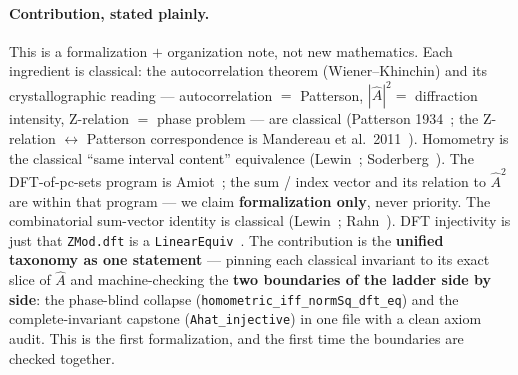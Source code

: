 \documentclass[11pt]{article}
\newcommand{\lean}[1]{\texttt{#1}}
\newcommand{\Ahat}{\hat{A}}
\begin{document}
\paragraph{Contribution, stated plainly.} This is a formalization $+$ organization note, not new
mathematics. Each ingredient is classical: the autocorrelation theorem (Wiener--Khinchin) and its
crystallographic reading --- autocorrelation $=$ Patterson, $|\Ahat|^2=$ diffraction intensity, Z-relation
$=$ phase problem --- are classical (Patterson 1934~\cite{Patterson}; the Z-relation $\leftrightarrow$
Patterson correspondence is Mandereau et al.\ 2011~\cite{MAAA}). Homometry is the classical
``same interval content'' equivalence (Lewin~\cite{Lewin}; Soderberg~\cite{Soderberg}). The DFT-of-pc-sets program is
Amiot~\cite{Amiot}; the sum / index vector and its relation to $\Ahat^2$ are within that program --- we
claim \textbf{formalization only}, never priority. The combinatorial sum-vector identity is classical
(Lewin~\cite{Lewin}; Rahn~\cite{Rahn}). DFT injectivity is just that \lean{ZMod.dft} is a
\lean{LinearEquiv}~\cite{Loeffler}. The contribution is the \textbf{unified taxonomy as one statement} ---
pinning each classical invariant to its exact slice of $\Ahat$ and machine-checking the \textbf{two
boundaries of the ladder side by side}: the phase-blind collapse
(\lean{homometric\_iff\_normSq\_dft\_eq}) and the complete-invariant capstone (\lean{Ahat\_injective}) in
one file with a clean axiom audit. This is the first formalization, and the first time the boundaries are
checked together.
\end{document}
